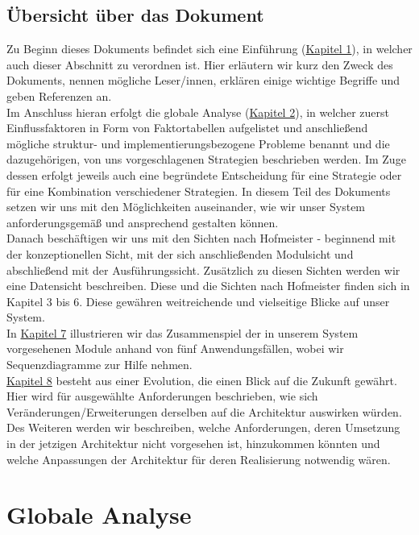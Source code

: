 \documentclass[enabledeprecatedfontcommands,fontsize=11pt,paper=a4,twoside]{scrartcl}
\newcounter{one}
\begin{document}
\subsection{Übersicht über das Dokument}
Zu Beginn dieses Dokuments befindet sich eine Einführung (\hyperref[sec:intro]{Kapitel 1}), in welcher auch dieser Abschnitt zu verordnen ist. Hier erläutern wir kurz den Zweck des Dokuments, nennen mögliche Leser/innen, erklären einige wichtige Begriffe und geben Referenzen an.  \\
Im Anschluss hieran erfolgt die globale Analyse (\hyperref[sec:globale_analyse]{Kapitel 2}), in welcher zuerst Einflussfaktoren in Form von Faktortabellen aufgelistet und anschließend mögliche struktur- und implementierungsbezogene Probleme benannt und die dazugehörigen, von uns vorgeschlagenen Strategien beschrieben werden. Im Zuge dessen erfolgt jeweils auch eine begründete Entscheidung für eine Strategie oder für eine Kombination verschiedener Strategien. In diesem Teil des Dokuments setzen wir uns mit den Möglichkeiten auseinander, wie wir unser System anforderungsgemäß und ansprechend gestalten können. \\
Danach beschäftigen wir uns mit den Sichten nach Hofmeister - beginnend mit der konzeptionellen Sicht, mit der sich anschließenden Modulsicht und abschließend mit der Ausführungssicht. Zusätzlich zu diesen Sichten werden wir eine Datensicht beschreiben. Diese und die Sichten nach Hofmeister finden sich in Kapitel 3 bis 6. Diese gewähren weitreichende und vielseitige Blicke auf unser System. \\
In \hyperref[sec:anwendungsfaelle]{Kapitel 7} illustrieren wir das Zusammenspiel der in unserem System vorgesehenen Module anhand von fünf Anwendungsfällen, wobei wir Sequenzdiagramme zur Hilfe nehmen. \\
\hyperref[sec:evolution]{Kapitel 8} besteht aus einer Evolution, die einen Blick auf die Zukunft gewährt. Hier wird für ausgewählte Anforderungen beschrieben, wie sich Veränderungen/Erweiterungen derselben auf die Architektur auswirken würden. Des Weiteren werden wir beschreiben, welche Anforderungen, deren Umsetzung in der jetzigen Architektur nicht vorgesehen ist, hinzukommen könnten und welche Anpassungen der Architektur für deren Realisierung notwendig wären.


\newpage
\section{Globale Analyse}
\label{sec:globale_analyse}
\end{document}
